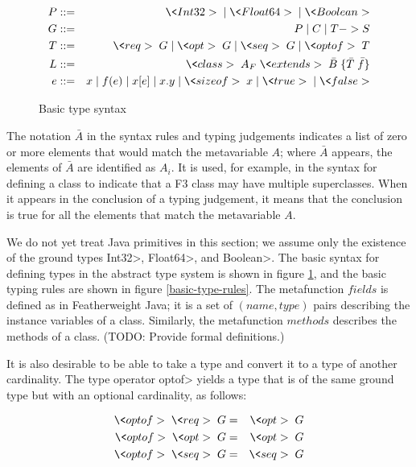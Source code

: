 \documentclass{article}
\newcommand{\req}{\<req>\;}
\newcommand{\opt}{\<opt>\;}
\newcommand{\seq}{\<seq>\;}
\newcommand{\optof}{\<optof>\;}
\newcommand{\sizeof}{\<sizeof>\;}
\newcommand{\alt}{\;|\;}
\newcommand{\class}[3]{\<class> \; #1 \; \<extends> \; \bar{#2} \; \{ #3 \} }
\begin{document}
\begin{figure}[htpb]
\begin{eqnarray*}
     P &::=& \<Int32> \alt \<Float64> \alt \<Boolean> \\
     G &::=& P \alt C \alt T -> S \\
     T &::=& \req G
           \alt \opt G
           \alt \seq G 
           \alt \optof T \\
     L &::=& \class{A_{F}}{B}{ \bar{T}\; \bar{f} } \\
     e &::=& x \alt f(e) \alt x[e] \alt x.y \alt \sizeof x \alt \<true> \alt \<false> 
\end{eqnarray*}
\caption{Basic type syntax}
\label{basic-type-syntax}
\end{figure}

The notation $\bar{A}$ in the syntax rules and typing judgements
indicates a list of zero or more elements that would match the
metavariable $A$; where $\bar{A}$ appears, the elements of $\bar{A}$
are identified as $A_i$.  It is used, for example, in the syntax for
defining a class to indicate that a F3 class may have multiple
superclasses.  When it appears in the conclusion of a typing
judgement, it means that the conclusion is true for all the elements
that match the metavariable $A$.

We do not yet treat Java primitives in this section; we assume only
the existence of the ground types \<Int32>, \<Float64>, and
\<Boolean>.  The basic syntax for defining types in the abstract type
system is shown in figure \ref{basic-type-syntax}, and the basic
typing rules are shown in figure \ref{basic-type-rules}.  The
metafunction $fields$ is defined as in Featherweight Java; it is a set
of $(name, type)$ pairs describing the instance variables of a class.
Similarly, the metafunction $methods$ describes the methods of a
class.  (TODO: Provide formal definitions.)

It is also desirable to be able to take a type and convert it to
a type of another cardinality.  The type operator \<optof> yields a type that is
of the same ground type but with an optional cardinality, as follows:

\begin{eqnarray*}
\optof \req G &=& \opt G \\
\optof \opt G &=& \opt G \\
\optof \seq G &=& \seq G \\
\end{eqnarray*}
\end{document}
